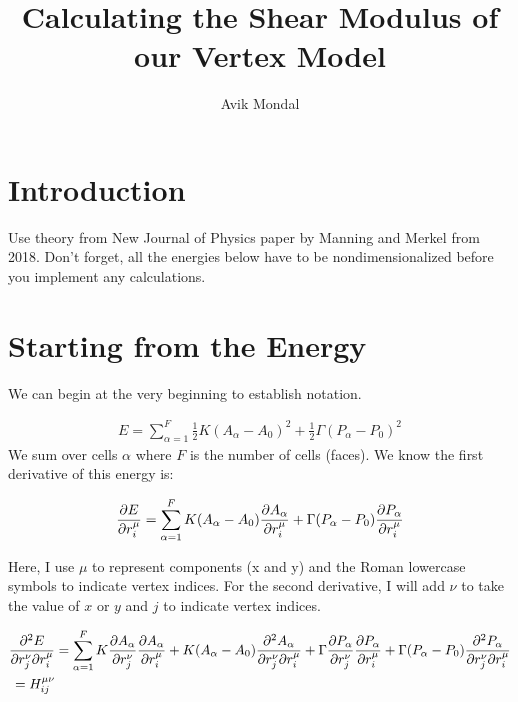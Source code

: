 \documentclass[12pt,a4paper]{article}
\begin{document}
\title{ Calculating the Shear Modulus of our Vertex Model }
\author{Avik Mondal}
\maketitle
\section{Introduction}

Use theory from New Journal of Physics paper by Manning and Merkel from 2018. Don't forget, all the energies below have to be nondimensionalized before you implement any calculations. 

\section{Starting from the Energy}
We can begin at the very beginning to establish notation.

\begin{align}
	\label{eqn: hamiltonian}
	E = \sum\limits_{\alpha=1}^{F} \frac{1}{2} K (A_\alpha - A_0)^2 + \frac{1}{2} \Gamma(P_\alpha - P_0)^2
\end{align}
We sum over cells $\alpha$ where $F$ is the number of cells (faces). We know the first derivative of this energy is:

\begin{align}
	\label{eqn: negativeforce}
	\pdv{E}{r_i^\mu} = \sum\limits_{\alpha=1}^{F} K (A_\alpha- A_0) \pdv{A_\alpha}{r_i^\mu} + \Gamma(P_\alpha - P_0)\pdv{P_\alpha}{r_i^\mu}
\end{align}

Here, I use $\mu$ to represent components (x and y) and the Roman lowercase symbols to indicate vertex indices. For the second derivative, I will add $\nu$ to take the value of $x$ or $y$ and $j$ to indicate vertex indices.

\begin{align}
	\label{eqn: Hessian1}
	\pdv[2]{E}{r_j^\nu}{r_i^\mu} &= \sum\limits_{\alpha=1}^{F}K \pdv{A_\alpha}{r_j^\nu} \pdv{A_\alpha}{r_i^\mu} + K (A_\alpha - A_0) \pdv[2]{A_\alpha}{r_j^\nu}{r_i^\mu} + \Gamma \pdv{P_\alpha}{r_j^\nu} \pdv{P_\alpha}{r_i^\mu} + \Gamma (P_\alpha - P_0)  \pdv[2]{P_{\alpha}}{r_j^\nu}{r_i^\mu} \\
	= H_{ij}^{\mu \nu}
\end{align}
\end{document}
